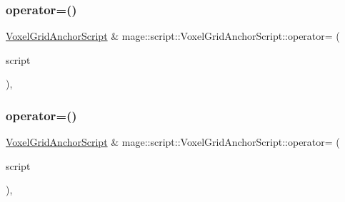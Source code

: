 \subsubsection{\texorpdfstring{operator=()}{operator=()}\hspace{0.1cm}{\footnotesize\ttfamily [1/2]}}
{\footnotesize\ttfamily \mbox{\hyperlink{classmage_1_1script_1_1_voxel_grid_anchor_script}{Voxel\+Grid\+Anchor\+Script}} \& mage\+::script\+::\+Voxel\+Grid\+Anchor\+Script\+::operator= (\begin{DoxyParamCaption}\item[{const \mbox{\hyperlink{classmage_1_1script_1_1_voxel_grid_anchor_script}{Voxel\+Grid\+Anchor\+Script}} \&}]{script }\end{DoxyParamCaption})\hspace{0.3cm}{\ttfamily [default]}, {\ttfamily [noexcept]}}

\mbox{\label{classmage_1_1script_1_1_voxel_grid_anchor_script_aca3a03b0192c968e2725f92a453618d7}} 
\subsubsection{\texorpdfstring{operator=()}{operator=()}\hspace{0.1cm}{\footnotesize\ttfamily [2/2]}}
{\footnotesize\ttfamily \mbox{\hyperlink{classmage_1_1script_1_1_voxel_grid_anchor_script}{Voxel\+Grid\+Anchor\+Script}} \& mage\+::script\+::\+Voxel\+Grid\+Anchor\+Script\+::operator= (\begin{DoxyParamCaption}\item[{\mbox{\hyperlink{classmage_1_1script_1_1_voxel_grid_anchor_script}{Voxel\+Grid\+Anchor\+Script}} \&\&}]{script }\end{DoxyParamCaption})\hspace{0.3cm}{\ttfamily [default]}, {\ttfamily [noexcept]}}

\mbox{\label{classmage_1_1script_1_1_voxel_grid_anchor_script_ae882db064cdf0e4fc524ad521ab51cf3}} 
